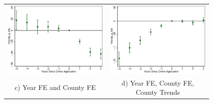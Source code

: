 \documentclass[11pt,letterpaper]{article}
\begin{document}
\begin{figure}
\begin{tabular}{cc}
\includegraphics[scale=0.57]{tabfig/evstu_snap_p_tot_one_yrcf_5_3}&\includegraphics[scale=0.57]{tabfig/evstu_snap_p_tot_one_yrcfsttr_5_3}\\
c) Year FE and County FE&d) Year FE, County FE, County Trends\\
\end{tabular}
\end{figure}
\end{document}
